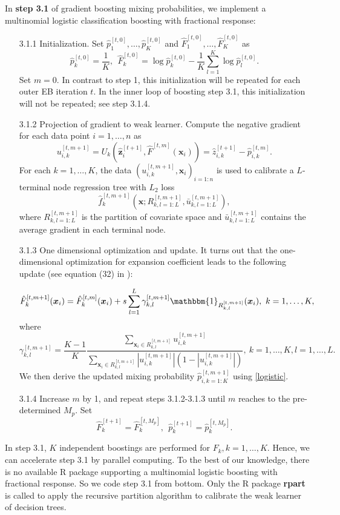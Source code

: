\documentclass[11pt]{article}
\numberwithin{equation}{section}
\def\bx{\boldsymbol{x}}
\def\bz{\boldsymbol{z}}
\begin{document}
In {\bf step 3.1} of gradient boosting mixing probabilities, we implement a  multinomial logistic classification boosting with fractional response: 
	\begin{enumerate}
		\item[3.1.1] Initialization. Set $\hat{p}_1^{[t,0]}, \ldots, \hat{p}_K^{[t,0]}$ and $\hat{F}_1^{[t,0]}, \ldots, \hat{F}_{K}^{[t,0]}$ as
		\begin{equation}\label{ini-1}			
		\hat{p}_k^{[t,0]}=\frac{1}{K},
		~~\hat{F}_k^{[t,0]}=\log \hat{p}_k^{[t,0]}-\frac{1}{K}\sum_{l=1}^K\log \hat{p}_l^{[t,0]}.
	\end{equation}
		Set $m=0$. In contrast to step 1, this initialization will be repeated for each outer EB iteration $t$.
		In the inner loop of boosting step 3.1, this initialization will not be repeated; see step 3.1.4. 
		\item[3.1.2] Projection of gradient to weak learner.
		Compute the negative gradient for each data point $i=1,\ldots,n$ as
		$$u_{i,k}^{[t,m+1]}=U_k(\hat{\bz}_{i}^{[t+1]},\hat{F}^{[t,m]}(\bx_i))=\hat{z}_{i,k}^{[t+1]}-\hat{p}_{i,k}^{[t,m]}.$$
		For each $k=1,\ldots, K$, the data $(u_{i,k}^{[t,m+1]},\bx_i)_{i=1:n}$ is used to calibrate a $L$-terminal node regression tree with $L_2$ loss $$\hat{f}_k^{[t,m+1]}\left(\bx;R^{[t,m+1]}_{k,l=1:L},\bar{u}^{[t,m+1]}_{k,l=1:L}\right),$$
		where $R^{[t,m+1]}_{k,l=1:L}$ is the partition of covariate space and $\bar{u}^{[t,m+1]}_{k,l=1:L}$ contains the average gradient in each terminal node.
		
		
	
		\item[3.1.3] One dimensional optimization and update. It turns out that  the one-dimensional optimization for expansion coefficient leads to the following update (see equation (32) in \citet{friedman2001greedy}):
		
		$$\hat{F}_k^{[t,m+1]}(\bx_i)=\hat{F}_k^{[t,m]}(\bx_i)+s\sum_{l=1}^L\gamma^{[t,m+1]}_{k,l}\mathbbm{1}_{R^{[t,m+1]}_{k,l}}(\bx_i),~ k=1,\ldots,K,$$
		where
		$$\gamma^{[t,m+1]}_{k,l}=\frac{K-1}{K}\frac{\sum_{\bx_i\in R_{k,l}^{[t,m+1]}}u_{i,k}^{[t,m+1]}}{\sum_{\bx_i\in R_{k,l}^{[t,m+1]}}\left|u_{i,k}^{[t,m+1]}\right|\left(1-\left|u_{i,k}^{[t,m+1]}\right|\right)}, ~k=1,\ldots,K, l=1,\ldots,L.$$
		We then derive the updated mixing probability $\hat{p}^{[t,m+1]}_{i,k=1:K}$  using \eqref{logistic}.
		
		
	
		\item[3.1.4] Increase $m$ by 1, and repeat steps 3.1.2-3.1.3  until $m$ reaches to the pre-determined $M_p$.
		Set $$\hat{F}_k^{[t+1]}=\hat{F}_k^{[t,M_p]},~~\hat{p}_k^{[t+1]}=\hat{p}_k^{[t,M_p]}.$$
	\end{enumerate}
In step 3.1, $K$ independent boostings are performed for $F_k, k=1,\ldots,K$. Hence, we can accelerate  step 3.1 by parallel computing.
To the best of our knowledge, there is no available R package supporting a  multinomial logistic boosting with fractional response.
So we code step 3.1 from bottom. Only the  R package {\bf rpart} is called to apply the recursive partition algorithm to calibrate the weak learner of decision trees.
\end{document}
